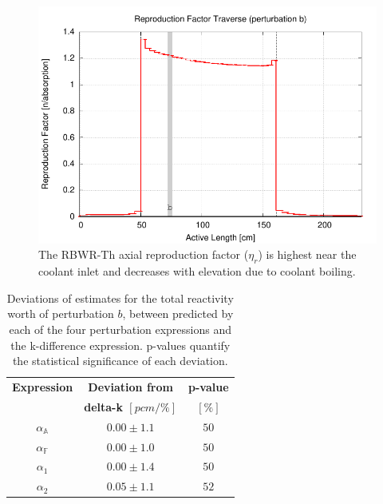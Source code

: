 \documentclass[11pt]{article}
\newcommand{\A}[0]{\mathbb{A}}
\newcommand{\F}[0]{\mathbb{F}}
\begin{document}
\clearpage
\begin{figure}[p]
  \centering
  \includegraphics[width=\textwidth, trim=0 0 0 0.275in, clip]{./img/Th-b-TraverseEta.pdf}
  \caption{The RBWR-Th axial reproduction factor ($\eta_r$) is highest near the coolant inlet and decreases with elevation due to coolant boiling.}
  \label{fig:etaR}
\end{figure}

\clearpage
\begin{table}[ht]
    \centering
    \caption{Deviations of estimates for the total reactivity worth of perturbation $b$, between predicted by each of the four perturbation expressions and the k-difference expression. p-values quantify the statistical significance of each deviation.}
    \label{tab:deltaAlpha}
    \begin{tabular}{| c | c | c |} \hline
    \textbf{Expression} & \textbf{Deviation from}     & \textbf{p-value} \\
                        & \textbf{delta-k $[pcm/\%]$} & \textbf{$[\%]$}  \\ \hline
    $\alpha_\A$         & $0.00 \pm 1.1$              & $50$             \\ \hline
    $\alpha_\F$         & $0.00 \pm 1.0$              & $50$             \\ \hline
    $\alpha_1$          & $0.00 \pm 1.4$              & $50$             \\ \hline
    $\alpha_2$          & $0.05 \pm 1.1$              & $52$             \\ \hline
    \end{tabular}
\end{table}
\end{document}
